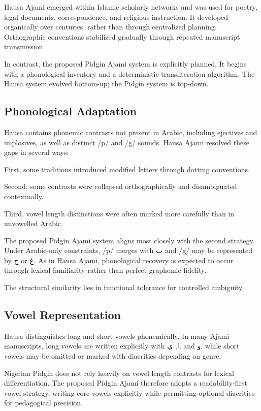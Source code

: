 \documentclass[12pt]{article}
\newcommand{\AR}[1]{\foreignlanguage{arabic}{#1}}
\begin{document}
Hausa Ajami emerged within Islamic scholarly networks and was used for poetry, legal documents, correspondence, and religious instruction. It developed organically over centuries, rather than through centralized planning. Orthographic conventions stabilized gradually through repeated manuscript transmission.

In contrast, the proposed Pidgin Ajami system is explicitly planned. It begins with a phonological inventory and a deterministic transliteration algorithm. The Hausa system evolved bottom-up; the Pidgin system is top-down.

\subsection{Phonological Adaptation}

Hausa contains phonemic contrasts not present in Arabic, including ejectives and implosives, as well as distinct /p/ and /g/ sounds. Hausa Ajami resolved these gaps in several ways:

First, some traditions introduced modified letters through dotting conventions.

Second, some contrasts were collapsed orthographically and disambiguated contextually.

Third, vowel length distinctions were often marked more carefully than in unvowelled Arabic.

The proposed Pidgin Ajami system aligns most closely with the second strategy. Under Arabic-only constraints, /p/ merges with \AR{ب} and /g/ may be represented by \AR{ج} or \AR{غ}. As in Hausa Ajami, phonological recovery is expected to occur through lexical familiarity rather than perfect graphemic fidelity.

The structural similarity lies in functional tolerance for controlled ambiguity.

\subsection{Vowel Representation}

Hausa distinguishes long and short vowels phonemically. In many Ajami manuscripts, long vowels are written explicitly with \AR{ا}, \AR{ي}, and \AR{و}, while short vowels may be omitted or marked with diacritics depending on genre.

Nigerian Pidgin does not rely heavily on vowel length contrasts for lexical differentiation. The proposed Pidgin Ajami therefore adopts a readability-first vowel strategy, writing core vowels explicitly while permitting optional diacritics for pedagogical precision.
\end{document}
